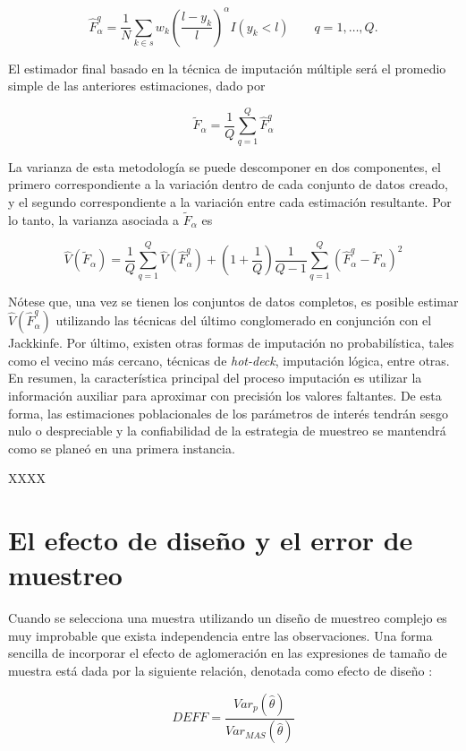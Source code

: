 \[
\hat{F}_{\alpha}^{q}=\frac{1}{N}\sum_{k\in s} w_k 
\left(\frac{l-y_k}{l}\right)^{\alpha}I(y_k<l) \ \ \ \ \ \ \ \ \ 
q= 1,\ldots, Q.
\]

El estimador final basado en la técnica de imputación múltiple será el promedio simple de las anteriores estimaciones, dado por

\[
\tilde{F}_{\alpha}=\frac{1}{Q}\sum_{q=1}^Q \hat{F}_{\alpha}^{q}
\]

La varianza de esta metodología se puede descomponer en dos componentes, el primero correspondiente a la variación dentro de cada conjunto de datos creado, y el segundo correspondiente a la variación entre cada estimación resultante. Por lo tanto, la varianza asociada a \(\tilde{F}_{\alpha}\) es

\[
\hat{V}(\tilde{F}_{\alpha})
= \frac{1}{Q}\sum_{q=1}^Q \hat{V}(\hat{F}_{\alpha}^{q})
+ \left(1+\frac{1}{Q}\right)\frac{1}{Q-1}\sum_{q=1}^Q (\hat{F}_{\alpha}^{q}-\tilde{F}_{\alpha})^2
\]

Nótese que, una vez se tienen los conjuntos de datos completos, es posible estimar \(\hat{V}(\hat{F}_{\alpha}^{q})\) utilizando las técnicas del último conglomerado en conjunción con el Jackkinfe. Por último, existen otras formas de imputación no probabilística, tales como el vecino más cercano, técnicas de \emph{hot-deck}, imputación lógica, entre otras. En resumen, la característica principal del proceso imputación es utilizar la información auxiliar para aproximar con precisión los valores faltantes. De esta forma, las estimaciones poblacionales de los parámetros de interés tendrán sesgo nulo o despreciable y la confiabilidad de la estrategia de muestreo se mantendrá como se planeó en una primera instancia.

XXXX

\hypertarget{el-efecto-de-diseno-y-el-error-de-muestreo}{%
\section{El efecto de diseño y el error de muestreo}\label{el-efecto-de-diseno-y-el-error-de-muestreo}}

Cuando se selecciona una muestra utilizando un diseño de muestreo complejo es muy improbable que exista independencia entre las observaciones. Una forma sencilla de incorporar el efecto de aglomeración en las expresiones de tamaño de muestra está dada por la siguiente relación, denotada como efecto de diseño \citep{Kish_1965}:

\[
DEFF=\frac{Var_p(\hat{\theta})}{Var_{MAS}(\hat{\theta})}
\]

